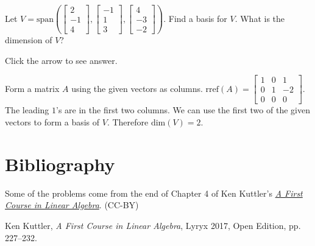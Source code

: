\documentclass{ximera}
\begin{document}
\begin{problem}\label{prob:dimCollectionVectors}
    Let $V=\text{span}\left(\begin{bmatrix}2\\-1\\4\end{bmatrix}, \begin{bmatrix}-1\\1\\3\end{bmatrix}, \begin{bmatrix}4\\-3\\-2\end{bmatrix}\right) $.  Find a basis for $V$.  What is the dimension of $V$?

Click the arrow to see answer.

\begin{expandable}
    Form a matrix $A$ using the given vectors as columns.  $\text{rref}(A)=\begin{bmatrix}1& 0 &1\\
 0& 1& -2\\
 0& 0& 0\end{bmatrix}$.  The leading $1$'s are in the first two columns.  We can use the first two of the given vectors to form a basis of $V$.  Therefore $\text{dim}(V)=2$.
\end{expandable}
\end{problem}


\section*{Bibliography}
Some of the problems come from the end of Chapter 4 of Ken Kuttler's \href{https://open.umn.edu/opentextbooks/textbooks/a-first-course-in-linear-algebra-2017}{\it A First Course in Linear Algebra}. (CC-BY)

Ken Kuttler, {\it  A First Course in Linear Algebra}, Lyryx 2017, Open Edition, pp. 227--232.
\end{document}
